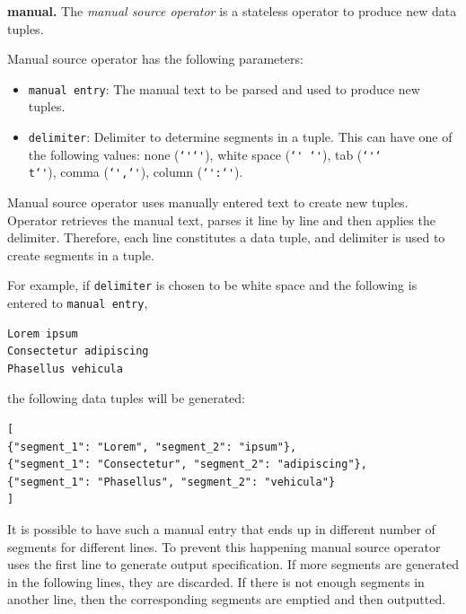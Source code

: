 
\textbf{manual.}
The \textit{manual source operator} is a stateless operator to produce new data 
tuples.

\newcommand{\ditto}{\texttt{\char`\'}}

Manual source operator has the following parameters:
\begin{itemize}
	\item \texttt{manual entry}: The manual text to be parsed and used to produce 
	new tuples.
	\item \texttt{delimiter}: Delimiter to determine segments in a tuple. This can have one 
	of the following values: none (\ditto\ditto), white space (\ditto\texttt{ }\ditto), 
	tab (\ditto\texttt{\char`\\t}\ditto), comma (\ditto\texttt{,}\ditto), 
	column (\ditto\texttt{:}\ditto).
\end{itemize}

Manual source operator uses manually entered text to create new tuples. Operator 
retrieves the manual text, parses it line by line and then applies the delimiter. 
Therefore, each line constitutes a data tuple, and delimiter is used to create segments 
in a tuple.

For example, if \texttt{delimiter} is chosen to be white space and the following is 
entered to \texttt{manual entry},

\begin{lstlisting}
Lorem ipsum
Consectetur adipiscing
Phasellus vehicula
\end{lstlisting}

\noindent the following data tuples will be generated:

\begin{lstlisting}
[
{"segment_1": "Lorem", "segment_2": "ipsum"},
{"segment_1": "Consectetur", "segment_2": "adipiscing"},
{"segment_1": "Phasellus", "segment_2": "vehicula"}
]
\end{lstlisting}

It is possible to have such a manual entry that ends up in different number of segments 
for different lines. To prevent this happening manual source operator uses the first line 
to generate output specification. If more segments are generated in the following lines, 
they are discarded. If there is not enough segments in another line, then the corresponding 
segments are emptied and then outputted.

